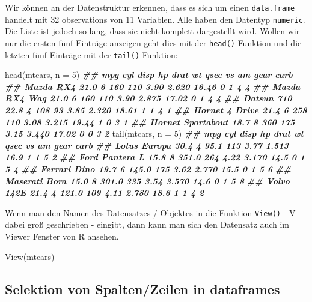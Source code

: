 \documentclass[
]{article}
\newenvironment{Shaded}{\begin{snugshade}}{\end{snugshade}}
\newcommand{\AttributeTok}[1]{\textcolor[rgb]{0.77,0.63,0.00}{#1}}
\newcommand{\DecValTok}[1]{\textcolor[rgb]{0.00,0.00,0.81}{#1}}
\newcommand{\DocumentationTok}[1]{\textcolor[rgb]{0.56,0.35,0.01}{\textbf{\textit{#1}}}}
\newcommand{\FunctionTok}[1]{\textcolor[rgb]{0.00,0.00,0.00}{#1}}
\newcommand{\NormalTok}[1]{#1}
\begin{document}
Wir können an der Datenstruktur erkennen, dass es sich um einen \texttt{data.frame} handelt mit 32 observations von 11 Variablen. Alle haben den Datentyp \texttt{numeric}. Die Liste ist jedoch so lang, dass sie nicht komplett dargestellt wird. Wollen wir nur die ersten fünf Einträge anzeigen geht dies mit der \texttt{head()} Funktion und die letzten fünf Einträge mit der \texttt{tail()} Funktion:

\begin{Shaded}
\begin{Highlighting}[]
\FunctionTok{head}\NormalTok{(mtcars, }\AttributeTok{n =} \DecValTok{5}\NormalTok{)}
\DocumentationTok{\#\#                    mpg cyl disp  hp drat    wt  qsec vs am gear carb}
\DocumentationTok{\#\# Mazda RX4         21.0   6  160 110 3.90 2.620 16.46  0  1    4    4}
\DocumentationTok{\#\# Mazda RX4 Wag     21.0   6  160 110 3.90 2.875 17.02  0  1    4    4}
\DocumentationTok{\#\# Datsun 710        22.8   4  108  93 3.85 2.320 18.61  1  1    4    1}
\DocumentationTok{\#\# Hornet 4 Drive    21.4   6  258 110 3.08 3.215 19.44  1  0    3    1}
\DocumentationTok{\#\# Hornet Sportabout 18.7   8  360 175 3.15 3.440 17.02  0  0    3    2}
\FunctionTok{tail}\NormalTok{(mtcars, }\AttributeTok{n =} \DecValTok{5}\NormalTok{)}
\DocumentationTok{\#\#                 mpg cyl  disp  hp drat    wt qsec vs am gear carb}
\DocumentationTok{\#\# Lotus Europa   30.4   4  95.1 113 3.77 1.513 16.9  1  1    5    2}
\DocumentationTok{\#\# Ford Pantera L 15.8   8 351.0 264 4.22 3.170 14.5  0  1    5    4}
\DocumentationTok{\#\# Ferrari Dino   19.7   6 145.0 175 3.62 2.770 15.5  0  1    5    6}
\DocumentationTok{\#\# Maserati Bora  15.0   8 301.0 335 3.54 3.570 14.6  0  1    5    8}
\DocumentationTok{\#\# Volvo 142E     21.4   4 121.0 109 4.11 2.780 18.6  1  1    4    2}
\end{Highlighting}
\end{Shaded}

Wenn man den Namen des Datensatzes / Objektes in die Funktion \texttt{View()} - V dabei groß geschrieben - eingibt, dann kann man sich den Datensatz auch im Viewer Fenster von R ansehen.

\begin{Shaded}
\begin{Highlighting}[]
\FunctionTok{View}\NormalTok{(mtcars)}
\end{Highlighting}
\end{Shaded}

\hypertarget{selektion-von-spaltenzeilen-in-dataframes}{%
\subsection{Selektion von Spalten/Zeilen in dataframes}\label{selektion-von-spaltenzeilen-in-dataframes}}
\end{document}
